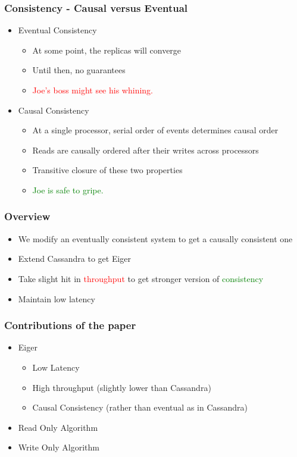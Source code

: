 \documentclass{beamer}
\begin{document}
\begin{frame}
\frametitle{Consistency - Causal versus Eventual}
\begin{itemize}
	\item Eventual Consistency
	\begin{itemize}
		\item At some point, the replicas will converge
		\item Until then, no guarantees
		\item \textcolor{red}{Joe's boss might see his whining.}	
	\end{itemize}

\pause \item Causal Consistency
	\begin{itemize}
		\item At a single processor, serial order of events determines causal order
		\item Reads are causally ordered after their writes across processors
		\item Transitive closure of these two properties
		\item \textcolor{green}{Joe is safe to gripe.}
	\end{itemize}

\end{itemize}  
\end{frame}


\begin{frame}
\frametitle{Overview}
\begin{itemize}

\item We modify an eventually consistent system to get a causally consistent one
\item Extend Cassandra to get Eiger
\item Take slight hit in \textcolor{red}{throughput} \newline to get stronger version of \textcolor{green}{consistency}
\item Maintain low latency

\end{itemize}  
\end{frame}

\begin{frame}
\frametitle{Contributions of the paper} 
\begin{itemize}
\item Eiger
	\begin{itemize}
		\item Low Latency
		\item High throughput (slightly lower than Cassandra)
		\item Causal Consistency (rather than eventual as in Cassandra)
	\end{itemize}
\item Read Only Algorithm
\item Write Only Algorithm
\end{itemize}  
\end{frame}
\end{document}
